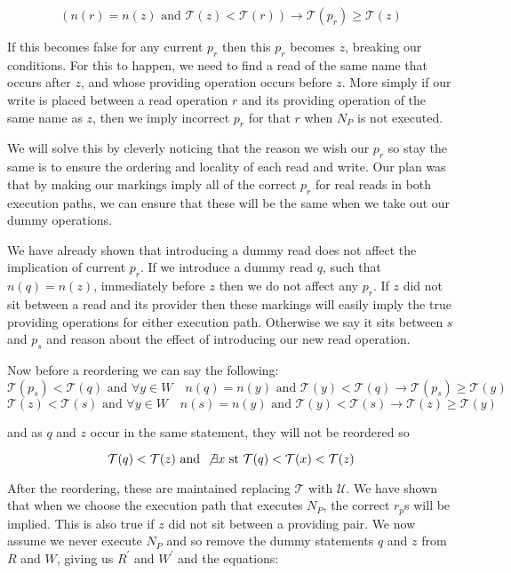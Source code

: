 \documentclass{report}
\begin{document}
$$(n(r) = n(z) \text{ and } \mathcal{T}(z) < \mathcal{T}(r)) \rightarrow \mathcal{T}(p_r) \ge \mathcal{T}(z)$$

If this becomes false for any current $p_r$ then this $p_r$ becomes $z$, breaking our conditions. For this to happen, we need to find a read of the same name
that occurs after $z$, and whose providing operation occurs before $z$. More simply if our write is placed between a read operation $r$ and its providing operation
of the same name as $z$, then we imply incorrect $p_r$ for that $r$ when $N_P$ is not executed.

We will solve this by cleverly noticing that the reason we wish our $p_r$ so stay the same is to ensure the ordering and locality of each read and write. Our
plan was that by making our markings imply all of the correct $p_r$ for real reads in both execution paths, we can ensure that these will be the same when we
take out our dummy operations.

We have already shown that introducing a dummy read does not affect the implication of current $p_r$. If we introduce a dummy read $q$, such that $n(q) = n(z)$,
immediately before $z$ then we do not affect any $p_r$. If $z$ did not sit between a read and its provider then these markings will easily imply the true
providing operations for either execution path. Otherwise we say it sits between $s$ and $p_s$ and reason about the effect of introducing our new read operation.

Now before a reordering we can say the following:
$$
\mathcal{T}(p_s) < \mathcal{T}(q) \text{ and }
\forall y \in W \quad n(q) = n(y) \text{ and } \mathcal{T}(y) < \mathcal{T}(q) \rightarrow \mathcal{T}(p_s) \ge \mathcal{T}(y)
$$
$$
\mathcal{T}(z) < \mathcal{T}(s) \text{ and }
\forall y \in W \quad n(s) = n(y) \text{ and } \mathcal{T}(y) < \mathcal{T}(s) \rightarrow \mathcal{T}(z) \ge \mathcal{T}(y)
$$

and as $q$ and $z$ occur in the same statement, they will not be reordered so

$$\mathcal{T}(q) < \mathcal{T}(z) \text{ and } \not \exists x \text{ st } \mathcal{T}(q) < \mathcal{T}(x) < \mathcal{T}(z)$$

After the reordering, these are maintained replacing $\mathcal{T}$ with $\mathcal{U}$. We have shown that when we choose the execution path that executes $N_P$,
the correct $r_p$s will be implied. This is also true if $z$ did not sit between a providing pair. We now assume we never execute $N_P$ and so remove the dummy
statements $q$ and $z$ from $R$ and $W$, giving us $R^\prime$ and $W^\prime$ and the equations:
\end{document}
